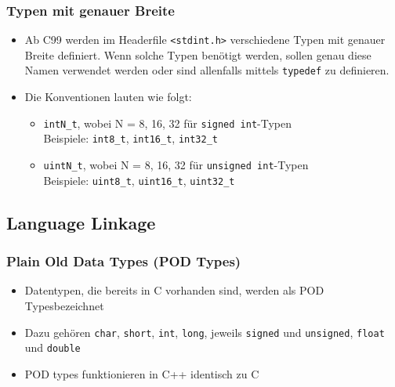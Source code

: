 \subsubsection{Typen mit genauer Breite}
\begin{itemize}
	\item Ab C99 werden im Headerfile \lstinline{<stdint.h>} verschiedene Typen mit genauer Breite definiert. Wenn solche Typen benötigt werden, sollen genau diese Namen verwendet werden oder sind allenfalls mittels \lstinline{typedef} zu definieren.
	\item Die Konventionen lauten wie folgt:
	\begin{itemize}
		\item \lstinline{intN_t}, wobei N = 8, 16, 32 für \lstinline{signed int}-Typen \\
		Beispiele: \lstinline{int8_t}, \lstinline{int16_t}, \lstinline{int32_t}
		\item \lstinline{uintN_t}, wobei N = 8, 16, 32 für \lstinline{unsigned int}-Typen \\
		Beispiele: \lstinline{uint8_t}, \lstinline{uint16_t}, \lstinline{uint32_t} 
	\end{itemize}
\end{itemize}

\subsection{Language Linkage}
\subsubsection{Plain Old Data Types (POD Types)}
\begin{itemize}
	\item Datentypen, die bereits in C vorhanden sind, werden als POD Typesbezeichnet
	\item Dazu gehören \lstinline{char}, \lstinline{short}, \lstinline{int}, \lstinline{long}, jeweils \lstinline{signed} und \lstinline{unsigned}, \lstinline{float} und \lstinline{double}
	\item POD types funktionieren in C++ identisch zu C
\end{itemize}

